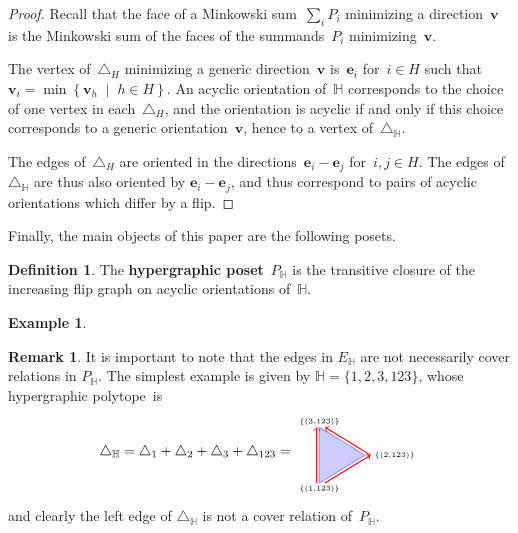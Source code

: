 \documentclass[reqno]{amsart}
\theoremstyle{definition}
\newtheorem{definition}[theorem]{Definition}
\newtheorem{example}[theorem]{Example}
\newtheorem{remark}[theorem]{Remark}
\renewcommand{\b}[1]{\boldsymbol{#1}} %
\newcommand{\set}[2]{\left\{ #1 \;\middle|\; #2 \right\}} %
\newcommand{\simplex}{\triangle} %
\newcommand{\defn}[1]{\textbf{\textsf{\color{PineGreen} #1}}} %
\newcommand{\vincent}[1]{\todo[color=blue!30]{#1 \\ \hfill --- V.}}
\newcommand{\HH}{\mathbb H}  %
\begin{document}
\begin{proof}
Recall that the face of a Minkowski sum~$\sum_i P_i$ minimizing a direction~$\b{v}$ is the Minkowski sum of the faces of the summands~$P_i$ minimizing~$\b{v}$.

The vertex of~$\simplex_H$ minimizing a generic direction~$\b{v}$ is~$\b{e}_i$ for~$i \in H$ such that~$\b{v}_i = \min\set{\b{v}_h}{h \in H}$.
An acyclic orientation of~$\HH$ corresponds to the choice of one vertex in each~$\simplex_H$, and the orientation is acyclic if and only if this choice corresponds to a generic orientation~$\b{v}$, hence to a vertex of~$\simplex_\HH$.

The edges of~$\simplex_H$ are oriented in the directions~$\b{e}_i-\b{e}_j$ for~$i,j \in H$.
The edges of~$\simplex_\HH$ are thus also oriented by $\b{e}_i-\b{e}_j$, and thus correspond to pairs of acyclic orientations which differ by a flip.
\end{proof}

Finally, the main objects of this paper are the following posets.

\begin{definition}
The \defn{hypergraphic poset}~$P_\HH$ is the transitive closure of the increasing flip graph on acyclic orientations of~$\HH$.
\end{definition}

\begin{example}
\vincent{todo}
\end{example}

\begin{remark}
\label{rem:edgeNotCover}
It is important to note that the edges in $E_\HH$ are not necessarily cover relations in $P_\HH$.
The simplest example is given by
$\HH=\{ 1, 2, 3, 123 \}$, 
whose hypergraphic polytope~is
\[
	\simplex_\HH=\simplex_1+\simplex_2+\simplex_3+\simplex_{123}=
	\begin{tikzpicture}[scale=.7,baseline=.0cm]
		\node (a) at (0,-1.2) {$\scriptscriptstyle \{(1, 123)\}$};
		\node (b) at (2.7,0) {$\scriptscriptstyle \{(2, 123)\}$};
		\node (c) at (0,1.2) {$\scriptscriptstyle \{(3, 123)\}$};
		\draw [color=blue!40,thick,fill=blue!20] (0,-1)--(0,1)--(1.632,0)--(0,-1) ; 
		\draw [color=red,thick,->] (-.1,-1)--(-.1,1); 
		\draw [color=red,thick,->] (1.832,0)--(.2,1); 
		\draw [color=red,thick,->] (.2,-1)--(1.832,0); 
	\end{tikzpicture}
\]
and clearly the left edge of $\simplex_\HH$ is not a cover relation of~$P_\HH$.
\end{remark}
\end{document}

